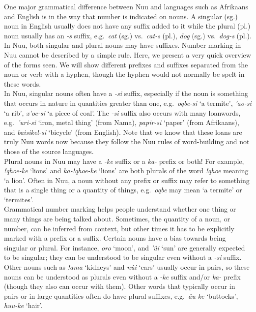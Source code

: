 One major grammatical difference between N\textipa{\textvertline}uu
and languages such as Afrikaans and English is in the way that number
is indicated on nouns. A singular (sg.) noun in English usually does
not have any suffix added to it while the plural (pl.) noun usually
has an \emph{-s} suffix, e.g.\ \emph{cat} (sg.) vs.\ \emph{cat-s}
(pl.), \emph{dog} (sg.) vs.\ \emph{dog-s} (pl.). In
N\textipa{\textvertline}uu, both singular and plural nouns may have
suffixes. Number marking in N\textipa{\textvertline}uu cannot be
described by a simple rule. Here, we present a very quick overview of
the forms seen. We will show different prefixes and suffixes separated
from the noun or verb with a hyphen, though the hyphen would not
normally be spelt in these words.\\

In N\textipa{\textvertline}uu, singular nouns often have a \emph{-si}
suffix, especially if the noun is something that occurs in nature in
quantities greater than one, e.g.\
\emph{\textipa{\textdoublevertline}oqbe-si} `a termite',
\emph{\textipa{\textdoublebarpipe}'ao-si} `a rib',
\emph{\textipa{\textdoublevertline}x'oe-si} `a piece of coal'. The
\emph{-si} suffix also occurs with many loanwords, e.g.\
\emph{\textipa{\textvertline}'uri-si} `iron, metal thing' (from Nama),
\emph{papir-si} `paper' (from Afrikaans), and \emph{baisikel-si}
`bicycle' (from English). Note that we know that these loans are truly
N\textipa{\textvertline}uu words now because they follow the
N\textipa{\textvertline}uu rules of word-building and not those of the
source languages.\\

Plural nouns in N\textipa{\textvertline}uu may have a \emph{-ke}
suffix or a \emph{ka-} prefix or both! For example, \emph{!qhoe-ke}
`lions' and \emph{ka-!qhoe-ke} `lions' are both plurals of the word
\emph{!qhoe} meaning `a lion'. Often in N\textipa{\textvertline}uu, a
noun without any prefix or suffix may refer to something that is a
single thing or a quantity of things, e.g.\
\emph{\textipa{\textdoublevertline}oqbe} may mean `a termite' or
`termites'.\\

Grammatical number marking helps people understand whether one thing
or many things are being talked about. Sometimes, the quantity of a
noun, or number, can be inferred from context, but other times it has
to be explicitly marked with a prefix or a suffix. Certain nouns have
a bias towards being singular or plural. For instance,
\emph{\textipa{\textdoublebarpipe}oro} `moon', and
\emph{\textipa{\textdoublevertline}'\^{u}i} `sun' are generally
expected to be singular; they can be understood to be singular even
without a \emph{-si} suffix. Other nouns such as \emph{!ama} `kidneys'
and \emph{n\textipa{\textdoublebarpipe}\^{u}i} `ears' usually occur in
pairs, so these nouns can be understood as plurals even without a
\emph{-ke} suffix and/or \emph{ka-} prefix (though they also can occur
with them). Other words that typically occur in pairs or in large
quantities often do have plural suffixes, e.g.\
\emph{\textipa{\textdoublebarpipe}\^{a}u-ke} `buttocks',
\emph{\textipa{\textvertline}huu-ke} `hair'.\\

